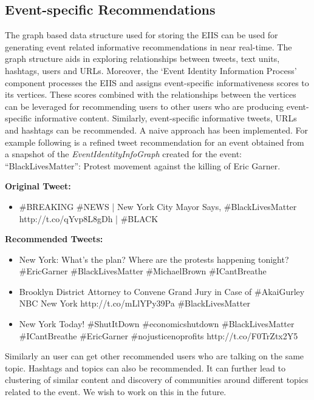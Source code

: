 \subsection{Event-specific Recommendations}
The graph based data structure used for storing the EIIS can be used for generating event related informative recommendations in near real-time. The graph structure aids in exploring relationships between tweets, text units, hashtags, users and URLs. Moreover, the `Event Identity Information Process' component processes the EIIS and assigns event-specific informativeness scores to its vertices. These scores combined with the relationships between the vertices can be leveraged for recommending users to other users who are producing event-specific informative content. Similarly, event-specific informative tweets, URLs and hashtags can be recommended. A naive approach has been implemented. For example following is a refined tweet recommendation for an event obtained from a snapshot of the \textit{EventIdentityInfoGraph} created for the event: “BlackLivesMatter”: Protest movement against the killing of Eric Garner.

\textbf{Original Tweet:}

\begin{itemize}
\item \#BREAKING \#NEWS | New York City Mayor Says, \#BlackLivesMatter \\ http://t.co/qYvp8L8gDh | \#BLACK  
\end{itemize}

\textbf{Recommended Tweets:}

\begin{itemize}

\item New York: What's the plan? Where are the protests happening tonight? \#EricGarner \#BlackLivesMatter \#MichaelBrown \#ICantBreathe

\item Brooklyn District Attorney to Convene Grand Jury in Case of \#AkaiGurley NBC New York http://t.co/mLlYPy39Pa \#BlackLivesMatter

\item New York Today! \#ShutItDown \#economicshutdown \#BlackLivesMatter \#ICantBreathe \#EricGarner \#nojusticenoprofits http://t.co/F0TrZtx2Y5

\end{itemize}

Similarly an user can get other recommended users who are talking on the same topic. Hashtags and topics can also be recommended. It can further lead to clustering of similar content and discovery of communities around different topics related to the event. We wish to work on this in the future.


